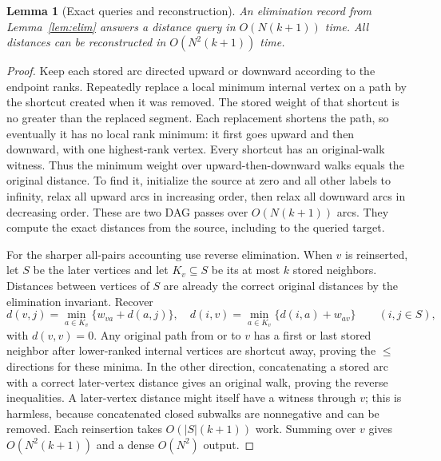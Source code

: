 \documentclass[manuscript,11pt,screen,nonacm]{acmart}
\newtheorem{lemma}[theorem]{Lemma}
\theoremstyle{definition}
\begin{document}
\begin{lemma}[Exact queries and reconstruction]\label{lem:recover}
An elimination record from Lemma~\ref{lem:elim} answers a distance query in $O(N(k+1))$ time. All distances can be reconstructed in $O(N^2(k+1))$ time.
\end{lemma}
\begin{proof}
Keep each stored arc directed upward or downward according to the endpoint ranks. Repeatedly replace a local minimum internal vertex on a path by the shortcut created when it was removed. The stored weight of that shortcut is no greater than the replaced segment. Each replacement shortens the path, so eventually it has no local rank minimum: it first goes upward and then downward, with one highest-rank vertex. Every shortcut has an original-walk witness. Thus the minimum weight over upward-then-downward walks equals the original distance. To find it, initialize the source at zero and all other labels to infinity, relax all upward arcs in increasing order, then relax all downward arcs in decreasing order. These are two DAG passes over $O(N(k+1))$ arcs. They compute the exact distances from the source, including to the queried target.

For the sharper all-pairs accounting use reverse elimination. When $v$ is reinserted, let $S$ be the later vertices and let $K_v\subseteq S$ be its at most $k$ stored neighbors. Distances between vertices of $S$ are already the correct original distances by the elimination invariant. Recover
\[
 d(v,j)=\min_{a\in K_v}\{w_{va}+d(a,j)\},\quad
 d(i,v)=\min_{a\in K_v}\{d(i,a)+w_{av}\}
 \qquad(i,j\in S),
\]
with $d(v,v)=0$. Any original path from or to $v$ has a first or last stored neighbor after lower-ranked internal vertices are shortcut away, proving the $\leq$ directions for these minima. In the other direction, concatenating a stored arc with a correct later-vertex distance gives an original walk, proving the reverse inequalities. A later-vertex distance might itself have a witness through $v$; this is harmless, because concatenated closed subwalks are nonnegative and can be removed. Each reinsertion takes $O(|S|(k+1))$ work. Summing over $v$ gives $O(N^2(k+1))$ and a dense $O(N^2)$ output.
\end{proof}
\end{document}

